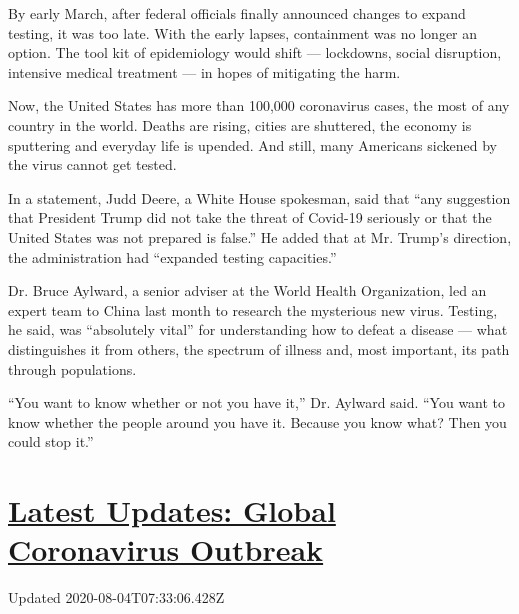 By early March, after federal officials finally announced changes to
expand testing, it was too late. With the early lapses, containment was
no longer an option. The tool kit of epidemiology would shift ---
lockdowns, social disruption, intensive medical treatment --- in hopes
of mitigating the harm.

Now, the United States has more than 100,000 coronavirus cases, the most
of any country in the world. Deaths are rising, cities are shuttered,
the economy is sputtering and everyday life is upended. And still, many
Americans sickened by the virus cannot get tested.

In a statement, Judd Deere, a White House spokesman, said that ``any
suggestion that President Trump did not take the threat of Covid-19
seriously or that the United States was not prepared is false.'' He
added that at Mr. Trump's direction, the administration had ``expanded
testing capacities.''

Dr. Bruce Aylward, a senior adviser at the World Health Organization,
led an expert team to China last month to research the mysterious new
virus. Testing, he said, was ``absolutely vital'' for understanding how
to defeat a disease --- what distinguishes it from others, the spectrum
of illness and, most important, its path through populations.

``You want to know whether or not you have it,'' Dr. Aylward said. ``You
want to know whether the people around you have it. Because you know
what? Then you could stop it.''

\hypertarget{latest-updates-global-coronavirus-outbreak}{%
\section{\texorpdfstring{\href{https://www.nytimes3xbfgragh.onion/2020/08/03/world/coronavirus-covid-19.html?action=click\&pgtype=Article\&state=default\&region=MAIN_CONTENT_1\&context=storylines_live_updates}{Latest
Updates: Global Coronavirus
Outbreak}}{Latest Updates: Global Coronavirus Outbreak}}\label{latest-updates-global-coronavirus-outbreak}}

Updated 2020-08-04T07:33:06.428Z

